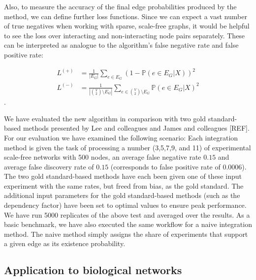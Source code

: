 \documentclass{bioinfo}
\newcommand{\prob}{\mathbb{P}}
\newcommand{\REF}{{\color{red}[REF]}}
\begin{document}
\begin{methods}
Also, to measure the accuracy of the final edge probabilities produced by the method, we can define further loss functions. Since we can expect a vast number of true negatives when working with sparse, scale-free graphs, it would be helpful to see the loss over interacting and non-interacting node pairs separately. These can be interpreted as analogue to the algorithm's false negative rate and false positive rate:

\begin{align} 
	L^{(+)} &= \frac{1}{|E_G|}\sum_{e \in E_G} (1 - \prob(e \in E_G|X))^2\\
	L^{(-)} &= \frac{1}{|\binom{V}{2} \setminus E_G|}\sum_{e \in \binom{V}{2} \setminus E_G} \prob(e \in E_G|X)^2
\end{align}.

We have evaluated the new algorithm in comparison with two gold standard-based methods presented by Lee and colleagues \citep{lee_probabilistic_2004} and James and colleagues \REF. For our evaluation we have examined the following scenario: Each integration method is given the task of processing a number (3,5,7,9, and 11) of experimental scale-free networks with 500 nodes, an average false negative rate $0.15$ and average false discovery rate of $0.15$ (corresponds to false positive rate of 0.0006). The two gold standard-based methods have each been given one of these input experiment with the same rates, but freed from bias, as the gold standard. The additional input parameters for the gold standard-based methods (such as the dependency factor) have been set to optimal values to ensure peak performance. We have run 5000 replicates of the above test and averaged over the results.
As a basic benchmark, we have also executed the same workflow for a naive integration method. The naive method simply assigns the share of experiments that support a given edge as its existence probability.

\subsection{Application to biological networks}


\end{methods}
\end{document}
